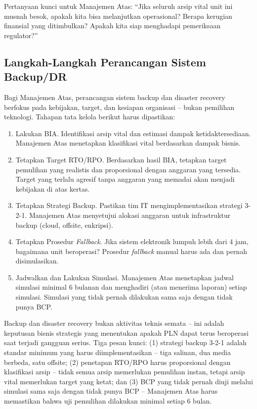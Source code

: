 \documentclass[12pt,a4paper]{report}
\begin{document}
Pertanyaan kunci untuk Manajemen Atas: ``Jika seluruh arsip vital unit ini musnah besok, apakah kita bisa melanjutkan operasional? Berapa kerugian finansial yang ditimbulkan? Apakah kita siap menghadapi pemeriksaan regulator?''


\subsection{Langkah-Langkah Perancangan Sistem Backup/DR}
Bagi Manajemen Atas, perancangan sistem backup dan disaster recovery berfokus pada kebijakan, target, dan kesiapan organisasi -- bukan pemilihan teknologi. Tahapan tata kelola berikut harus dipastikan:

\begin{enumerate}[leftmargin=*]
    \item Lakukan BIA. Identifikasi arsip vital dan estimasi dampak ketidaktersediaan. Manajemen Atas menetapkan klasifikasi vital berdasarkan dampak bisnis.
    \item Tetapkan Target RTO/RPO. Berdasarkan hasil BIA, tetapkan target pemulihan yang realistis dan proporsional dengan anggaran yang tersedia. Target yang terlalu agresif tanpa anggaran yang memadai akan menjadi kebijakan di atas kertas.
    \item Tetapkan Strategi Backup. Pastikan tim IT mengimplementasikan strategi 3-2-1. Manajemen Atas menyetujui alokasi anggaran untuk infrastruktur backup (cloud, offsite, enkripsi).
    \item Tetapkan Prosedur \textit{Fallback}. Jika sistem elektronik lumpuh lebih dari 4 jam, bagaimana unit beroperasi? Prosedur \textit{fallback} manual harus ada dan pernah disimulasikan.
    \item Jadwalkan dan Lakukan Simulasi. Manajemen Atas menetapkan jadwal simulasi minimal 6 bulanan dan menghadiri (atau menerima laporan) setiap simulasi. Simulasi yang tidak pernah dilakukan sama saja dengan tidak punya BCP.
\end{enumerate}

\begin{plnbox}
Backup dan disaster recovery bukan aktivitas teknis semata -- ini adalah keputusan bisnis strategis yang menentukan apakah PLN dapat terus beroperasi saat terjadi gangguan serius. Tiga pesan kunci: (1) strategi backup 3-2-1 adalah standar minimum yang harus diimplementasikan -- tiga salinan, dua media berbeda, satu offsite; (2) penetapan RTO/RPO harus proporsional dengan klasifikasi arsip -- tidak semua arsip memerlukan pemulihan instan, tetapi arsip vital memerlukan target yang ketat; dan (3) BCP yang tidak pernah diuji melalui simulasi sama saja dengan tidak punya BCP -- Manajemen Atas harus memastikan bahwa uji pemulihan dilakukan minimal setiap 6 bulan.
\end{plnbox}
\end{document}
